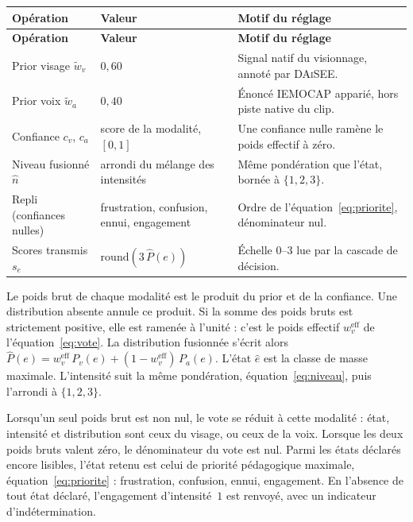 {\small
\renewcommand{\arraystretch}{1.18}
\setlength{\tabcolsep}{4pt}
\begin{xltabular}{\textwidth}{|>{\raggedright\arraybackslash}X|>{\raggedright\arraybackslash}X|>{\raggedright\arraybackslash}X|}
\hline
{}
\textbf{Opération} & \textbf{Valeur} & \textbf{Motif du réglage} \\
\hline
\endfirsthead
\hline
{}
\textbf{Opération} & \textbf{Valeur} & \textbf{Motif du réglage} \\
\hline
\endhead
\endfoot
\endlastfoot
Prior visage $\tilde{w}_v$ & $0{,}60$ &
Signal natif du visionnage, annoté par \textsc{DAiSEE}. \\
\hline
Prior voix $\tilde{w}_a$ & $0{,}40$ &
Énoncé \textsc{IEMOCAP} apparié, hors piste native du clip. \\
\hline
Confiance $c_v$, $c_a$ & score de la modalité, $[0,1]$ &
Une confiance nulle ramène le poids effectif à zéro. \\
\hline
Niveau fusionné $\hat{n}$ & arrondi du mélange des intensités &
Même pondération que l'état, bornée à $\{1,2,3\}$. \\
\hline
Repli (confiances nulles) &
frustration, confusion, ennui, engagement &
Ordre de l'équation~\ref{eq:priorite}, dénominateur nul. \\
\hline
Scores transmis $s_e$ & $\mathrm{round}(3\,\hat{P}(e))$ &
Échelle $0$--$3$ lue par la cascade de décision. \\
\hline
\end{xltabular}
\label{tab:params-fusion}
}

Le poids brut de chaque modalité est le produit du prior et de la
confiance. Une distribution absente annule ce produit. Si la somme
des poids bruts est strictement positive, elle est ramenée à
l'unité : c'est le poids effectif $w_v^{\mathrm{eff}}$ de
l'équation~\ref{eq:vote}. La distribution fusionnée s'écrit alors
$\hat{P}(e)=w_v^{\mathrm{eff}}\,P_v(e)
+(1-w_v^{\mathrm{eff}})\,P_a(e)$. L'état $\hat{e}$ est la classe de
masse maximale. L'intensité suit la même pondération,
équation~\ref{eq:niveau}, puis l'arrondi à $\{1,2,3\}$.

Lorsqu'un seul poids brut est non nul, le vote se réduit à cette
modalité : état, intensité et distribution sont ceux du visage, ou
ceux de la voix. Lorsque les deux poids bruts valent zéro, le
dénominateur du vote est nul. Parmi les états déclarés encore
lisibles, l'état retenu est celui de priorité pédagogique maximale,
équation~\ref{eq:priorite} : frustration, confusion, ennui,
engagement. En l'absence de tout état déclaré, l'engagement
d'intensité~$1$ est renvoyé, avec un indicateur d'indétermination.

